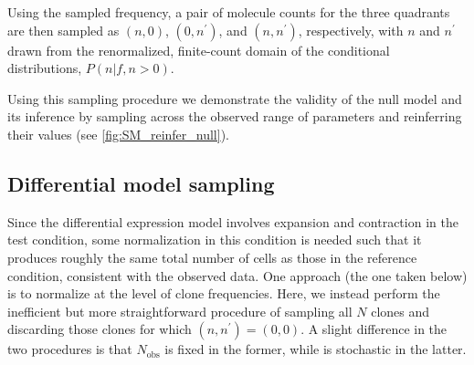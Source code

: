 Using the sampled frequency, a pair of molecule counts for the three quadrants are then sampled as $(n,0)$, $(0,n^{\prime})$, and $(n,n^{\prime})$, respectively, with $n$ and $n^{\prime}$ drawn from the renormalized, finite-count domain of the conditional distributions, $P(n|f,n>0)$. 

% 

Using this sampling procedure we demonstrate the validity of the null model and its inference by sampling across the observed range of parameters and reinferring their values (see \cref{fig:SM_reinfer_null}).


\subsection*{Differential model sampling}\label{sec:diffexpr_sampling}
Since the differential expression model involves expansion and contraction in the test condition, some normalization in this condition is needed such that it produces roughly the same total number of cells as those in the reference condition, consistent with the observed data. One approach (the one taken below) is to normalize at the level of clone frequencies. 
Here, we instead perform the inefficient but more straightforward procedure of sampling all $N$ clones and discarding those clones for which $(n,n^{\prime})=(0,0)$. A slight difference in the two procedures is that $N_{\textrm{obs}}$ is fixed in the former, while is stochastic in the latter.


